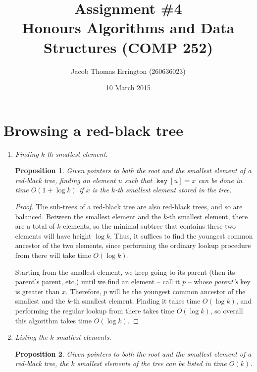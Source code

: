\documentclass{article}
\author{Jacob Thomas Errington (260636023)}
\title{Assignment \#4\\Honours Algorithms and Data Structures (COMP 252)}
\date{10 March 2015}
\newtheorem{proposition}{Proposition}
\DeclareMathOperator{\Key}{\mathtt{key}}
\begin{document}
\maketitle

\section{Browsing a red-black tree}

\begin{enumerate}
    \item \emph{Finding $k$-th smallest element.}

        \begin{proposition}
            Given pointers to both the root and the smallest element of a
            red-black tree, finding an element $u$ such that $\Key{[u]} = x$
            can be done in time $O(1 + \log k)$ if $x$ is the $k$-th smallest
            element stored in the tree.
        \end{proposition}

        \begin{proof}
            The sub-trees of a red-black tree are also red-black trees, and so
            are balanced. Between the smallest element and the $k$-th smallest
            element, there are a total of $k$ elements, so the minimal subtree
            that contains these two elements will have height $\log k$. Thus,
            it suffices to find the youngest common ancestor of the two
            elements, since performing the ordinary lookup procedure from there
            will take time $O(\log k)$.

            Starting from the smallest element, we keep going to its parent
            (then its parent's parent, etc.) until we find an element -- call
            it $p$ -- whose \emph{parent's} key is greater than $x$. Therefore,
            $p$ will be the youngest common ancestor of the smallest and the
            $k$-th smallest element. Finding it takes time $O(\log k)$, and
            performing the regular lookup from there takes time $O(\log k)$, so
            overall this algorithm takes time $O(\log k)$.
        \end{proof}

    \item \emph{Listing the $k$ smallest elements.}

        \begin{proposition}
            Given pointers to both the root and the smallest element of a
            red-black tree, the $k$ smallest elements of the tree can be listed
            in time $O(k)$.
        \end{proposition}


\end{enumerate}
\end{document}
